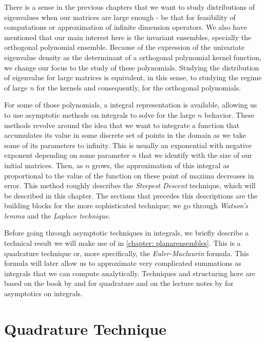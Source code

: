 There is a sense in the previous chapters that we want to study distributions of eigenvalues when our matrices are large enough - be that for feasibility of computations or approximation of infinite dimension operators. We also have mentioned that our main interest here is the invariant ensembles, specially the orthogonal polynomial ensemble. Because of the expression of the univariate eigenvalue density as the determinant of a orthogonal polynomial kernel function, we change our focus to the study of these polynomials. Studying the distribution of eigenvalue for large matrices is equivalent, in this sense, to studying the regime of large $n$ for the kernels and consequently, for the orthogonal polynomials. 

For some of those polynomials, a integral representation is available, allowing us to use asymptotic methods on integrals to solve for the large $n$ behavior. These methods revolve around the idea that we want to integrate a function that accumulates its value in some discrete set of points in the domain as we take some of its parameters to infinity. This is usually an exponential with negative exponent depending on some parameter $n$ that we identify with the size of our initial matrices. Then, as $n$ grows, the approximation of this integral as proportional to the value of the function on these point of maxima decreases in error. This method roughly describes the \textit{Steepest Descent} technique, which will be described in this chapter. The sections that precedes this descriptions are the building blocks for the more sophisticated technique; we go through \textit{Watson's lemma} and the \textit{Laplace technique}.

Before going through asymptotic techniques in integrals, we briefly describe a technical result we will make use of in \autoref{chapter: planarensembles}. This is a quadrature technique or, more specifically, the \textit{Euler-Maclaurin} formula. This formula will later allow us to approximate very complicated summations as integrals that we can compute analytically. Techniques and structuring here are based on the book by  and  for quadrature and on the lecture notes by  for asymptotics on integrals. 

\section{Quadrature Technique}
\label{section: quadrature}

